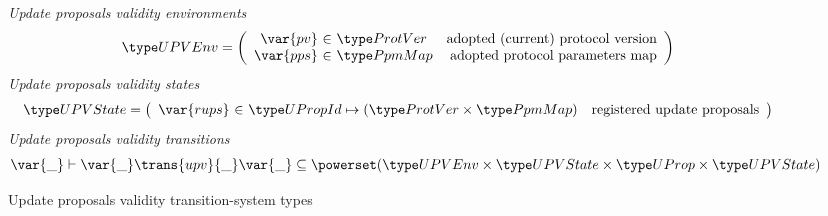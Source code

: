 \begin{figure}[htb]
  \emph{Update proposals validity environments}
  \begin{equation*}
    \UPVEnv =
    \left(
      \begin{array}{r@{~\in~}lr}
        \var{pv} & \ProtVer & \text{adopted (current) protocol version}\\
        \var{pps} & \PPMMap & \text{adopted protocol parameters map}\\
      \end{array}
    \right)
  \end{equation*}
  \emph{Update proposals validity states}
  \begin{equation*}
    \UPVState
    = \left(
      \begin{array}{r@{~\in~}lr}
        \var{rups} & \UPropId \mapsto (\ProtVer \times \PPMMap)
        & \text{registered update proposals}\\
      \end{array}
    \right)
  \end{equation*}
  \emph{Update proposals validity transitions}
    \begin{equation*}
    \var{\_} \vdash
    \var{\_} \trans{upv}{\_} \var{\_}
    \subseteq \powerset (\UPVEnv \times \UPVState \times \UProp \times \UPVState)
  \end{equation*}
  \caption{Update proposals validity transition-system types}
  \label{fig:ts-types:up-validity}
\end{figure}

